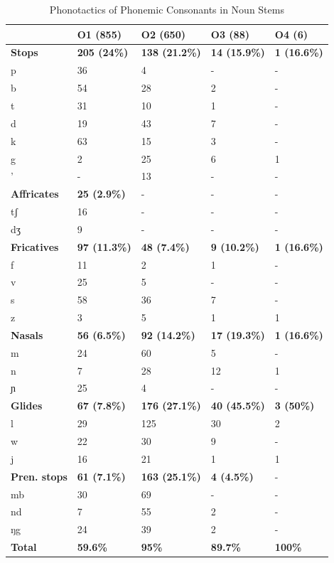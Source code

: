 \begin{table} 
\centering
\begin{tabular}{l|llll}
 \midrule
 & O1 (855) & O2 (650) &  O3 (88)   & O4 (6) \\  \midrule
{\bfseries Stops}  & {\bfseries 205 (24\%)} & {\bfseries 138 (21.2\%)}  & {\bfseries 14 (15.9\%)} &   {\bfseries 1 (16.6\%)}  \\ 
        p &  36  & 4  &  -  & - \\ 
         b  &  54   &  28  &  2  & - \\
          t  &   31  &  10  &  1 &  - \\
        d   &   19 &   43 &  7  & - \\
         k  &   63  &   15  & 3  & - \\
          g &   2  &  25  & 6 & 1 \\
         '  &   -   & 13   & -  & - \\  \midrule
{\bfseries Affricates}  & {\bfseries 25 (2.9\%)}  & - & - & - \\ 
	tʃ &  16   &  -  & - &  -\\
	dʒ &  9  &  -  & -   & - \\   \midrule
{\bfseries Fricatives}  & {\bfseries 97 (11.3\%)} & {\bfseries 48 (7.4\%)} & {\bfseries 9 (10.2\%)} &  {\bfseries 1 (16.6\%)}  \\
           f& 11 &  2  & 1 & - \\ 
           v &  25   &  5  & -  & - \\ 
          s  &  58    &  36  & 7  & - \\
         z  &  3   &  5  & 1  &  1 \\  \midrule
{\bfseries Nasals}  & {\bfseries 56 (6.5\%)} & {\bfseries 92 (14.2\%)}  & {\bfseries 17 (19.3\%)}  &  {\bfseries 1 (16.6\%)}  \\
         m & 24     &  60   & 5 & - \\ 
         n  &   7   &   28  & 12  & 1 \\
         ɲ  &  25    & 4   & - & -  \\  \midrule
{\bfseries Glides}  & {\bfseries 67 (7.8\%)} & {\bfseries 176 (27.1\%)}  & {\bfseries 40 (45.5\%)} &  {\bfseries 3 (50\%)}  \\
           l &   29  &  125  &  30 &  2 \\
           w &   22  &   30  &  9 &  - \\
           j  &  16   &  21  & 1  & 1 \\  \midrule
{\bfseries Pren. stops}  & {\bfseries 61 (7.1\%)}   & {\bfseries 163 (25.1\%)} & {\bfseries 4 (4.5\%)} & - \\
	mb    & 30 & 69 & - & - \\
	nd     & 7 & 55 & 2 & - \\
	ŋg	& 24  & 39 & 2 & - \\  \midrule
{\bfseries Total} & {\bfseries 59.6\%} & {\bfseries 95\%} & {\bfseries 89.7\%} & {\bfseries 100\%}   \\  \midrule	
\end{tabular}
\caption{Phonotactics of Phonemic Consonants in Noun Stems}
\label{Tab:PhonotactN}
\end{table}


